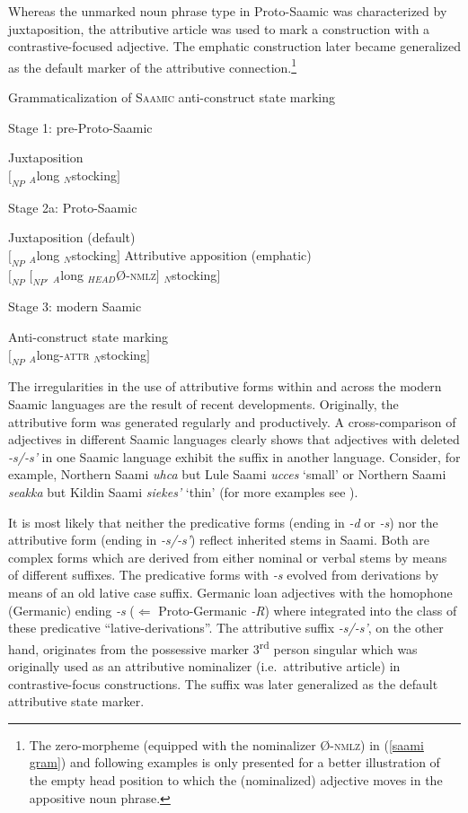 {Whereas the unmarked noun phrase type in Proto-Saamic was characterized by juxtaposition, the attributive article was used to mark a construction with a contrastive-focused adjective. The emphatic construction later became generalized as the default marker of the attributive connection.\footnote{The zero-morpheme (equipped with the nominalizer Ø-\textsc{nmlz}) in (\ref{saami gram}) and following examples is only presented for a better illustration of the empty head position to which the (nominalized) adjective moves in the appositive noun phrase.}
\begin{exe}
\ex 	Grammaticalization of \textsc{Saamic} anti-construct state marking\label{saami gram}
\begin{xlist}
\ex	Stage 1: pre-Proto-Saamic
\begin{xlist}
\ex	Juxtaposition\\
	$[_{NP}$ $_{A}$long $_{N}$stocking$]$
\end{xlist}
\ex	Stage 2a: Proto-Saamic
\begin{xlist}
\ex	Juxtaposition (default)\\
	$[_{NP}$ $_{A}$long $_{N}$stocking$]$
\ex	Attributive apposition (emphatic)\\
	$[_{NP}$ $[_{NP'}$ $_{A}$long $_{HEAD}$Ø-\textsc{nmlz}$]$ $_{N}$stocking$]$
\end{xlist}
\ex	Stage 3: modern Saamic
\begin{xlist}
\ex	Anti-construct state marking\\
	$[_{NP}$ $_{A}$long-\textsc{attr} $_{N}$stocking$]$
\end{xlist}
\end{xlist}
\end{exe}
The irregularities in the use of attributive forms within and across the modern Saamic languages are the result of recent developments. Originally, the attributive form was generated regularly and productively. A cross-comparison of adjectives in different Saamic languages clearly shows that adjectives with deleted \textit{-s/-s'} in one Saamic language exhibit the suffix in another language. Consider, for example, Northern Saami \textit{uhca} but Lule Saami \textit{ucces} ‘small’ or Northern Saami \textit{seakka} but Kildin Saami \textit{sie{\ng}{\ng}kes'} ‘thin’ (for more examples see \citealt{riesler2006b}).

It is most likely that neither the predicative forms (ending in \textit{-d} or \textit{-s}) nor the attributive form (ending in \textit{-s/-s'}) reflect inherited stems in Saami. Both are complex forms which are derived from either nominal or verbal stems by means of different suffixes. The predicative forms with \textit{-s} evolved from derivations by means of an old lative case suffix. Germanic loan adjectives with the homophone (Germanic) ending \textit{-s} ($\Leftarrow$ Proto-Germanic \textit{-R}) where integrated into the class of these predicative “lative-derivations”. The attributive suffix \textit{-s/-s'}, on the other hand, originates from the possessive marker 3\textsuperscript{rd} person singular which was originally used as an attributive nominalizer (i.e.~attributive article) in contrastive-focus constructions. The suffix was later generalized as the default attributive state marker.

}
